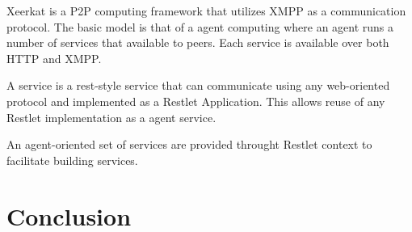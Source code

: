 \documentclass[12pt]{scrartcl}
\begin{document}
Xeerkat is a P2P computing framework that utilizes XMPP as a communication protocol. The basic model is that of a agent computing where an agent runs a number of services that available to peers. Each service is available over both HTTP and XMPP.

A service is a rest-style service that can communicate using any web-oriented protocol and implemented as a Restlet Application. This allows reuse of any Restlet implementation as a agent service.

An agent-oriented set of services are provided throught Restlet context to facilitate building services.

\newpage

\section*{Conclusion} 



\end{document}
